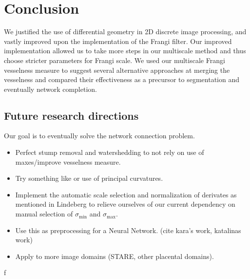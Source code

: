 \chapter{Conclusion} \label{ch:conclusion}

We justified the use of differential geometry in 2D discrete image processing, and vastly improved upon the implementation of the Frangi filter. Our improved implementation allowed us to take more steps in our multiscale method and thus choose stricter parameters for Frangi scale. We used our multiscale Frangi vesselness measure to suggest several alternative approaches at merging the vesselness and compared their effectiveness as a precursor to segmentation and eventually network completion.

\section{Future research directions} \label{sec:future-research-directions}

Our goal is to eventually solve the network connection problem.
\begin{itemize}
	\item Perfect stump removal and watershedding to not rely on use of maxes/improve vesselness measure.
	\item Try something like \cite{laptev2000automatic} or use of principal curvatures.
	\item Implement the automatic scale selection and normalization of derivates as mentioned in Lindeberg \cite{lindeberg1998feature} to relieve ourselves of
        our current dependency on manual selection of $\sigma_{\min}$ and  $\sigma_{\max}$. 
\item Use this as preprocessing for a Neural Network.
	(cite kara's work, katalinas work)
	\item Apply to more image domains (STARE, other placental domains).
	\end{itemize}

f

